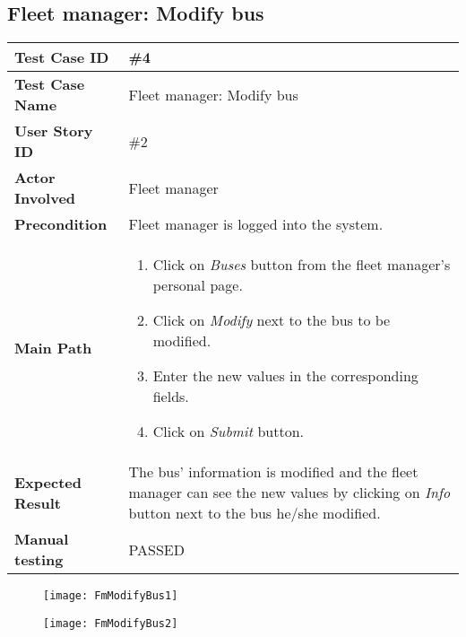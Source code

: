 \subsection{Fleet manager: Modify bus}
\begin{center}
	\begin{tabular} { | m{3.5cm} | m{9.5cm} | }
		\hline
		\textbf{Test Case ID} & \#4\\
		\hline
		\textbf{Test Case Name} & Fleet manager: Modify bus\\
		\hline
		\textbf{User Story ID} & \#2 \\
		\hline
		\textbf{Actor Involved} & Fleet manager\\
		\hline
		\textbf{Precondition} & Fleet manager is logged into the system.\\
		\hline
		\textbf{Main Path} & 
		\begin{enumerate}
			\item Click on \textit{Buses} button from the fleet manager's personal page.
			\item Click on \textit{Modify} next to the bus to be modified.
			\item Enter the new values in the corresponding fields.
			\item Click on \textit{Submit} button.
		\end{enumerate}\\
		\hline
		\textbf{Expected Result} & The bus' information is modified and the fleet manager can see the new values by clicking on \textit{Info} button next to the bus he/she modified.\\
		\hline
	\textbf{Manual testing} & PASSED\\
	\hline
\end{tabular}
\end{center}
\begin{figure}[H]
\centering
\texttt{[image: FmModifyBus1]}
\end{figure}
\begin{figure}[H]
\centering
\texttt{[image: FmModifyBus2]}
\end{figure}
\newpage
